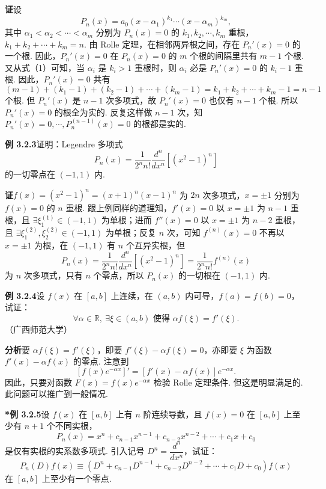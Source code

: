 \documentclass[UTF8,12pt,a4paper,fontset=fandol]{ctexart}
\begin{document}
\noindent\textbf{证}\quad 设
\begin{equation}
  P_n(x)=a_0(x-\alpha_1)^{k_1}\cdots(x-\alpha_m)^{k_m},
\tag{1}
\end{equation}
其中 $\alpha_1<\alpha_2<\cdots<\alpha_m$ 分别为 $P_n(x)=0$ 的 $k_1,k_2,\cdots,k_m$ 重根，$k_1+k_2+\cdots+k_m=n$. 由 Rolle 定理，在相邻两异根之间，存在 $P_n'(x)=0$ 的一个根. 因此，$P_n'(x)=0$ 在 $P_n(x)=0$ 的 $m$ 个根的间隔里共有 $m-1$ 个根. 又从式（1）可知，当 $\alpha_i$ 是 $k_i>1$ 重根时，则 $\alpha_i$ 必是 $P_n'(x)=0$ 的 $k_i-1$ 重根. 因此，$P_n'(x)=0$ 共有
\[
  (m-1)+(k_1-1)+(k_2-1)+\cdots+(k_m-1)
  =k_1+k_2+\cdots+k_m-1=n-1
\]
个根. 但 $P_n'(x)$ 是 $n-1$ 次多项式，故 $P_n'(x)=0$ 也仅有 $n-1$ 个根. 所以 $P_n'(x)=0$ 的根全为实的. 反复这样做 $n-1$ 次，知 $P_n'(x)=0,\cdots,P_n^{(n-1)}(x)=0$ 的根都是实的.

\noindent\textbf{例 3.2.3}\quad 证明：Legendre 多项式
\[
  P_n(x)=\frac{1}{2^nn!}\frac{d^n}{dx^n}\left[(x^2-1)^n\right]
\]
的一切零点在 $(-1,1)$ 内.

\noindent\textbf{证}\quad $f(x)=(x^2-1)^n=(x+1)^n(x-1)^n$ 为 $2n$ 次多项式，$x=\pm1$ 分别为 $f(x)=0$ 的 $n$ 重根. 跟上例同样的道理知，$f'(x)=0$ 以 $x=\pm1$ 为 $n-1$ 重根，且 $\exists\xi_1^{(1)}\in(-1,1)$ 为单根；进而 $f''(x)=0$ 以 $x=\pm1$ 为 $n-2$ 重根，且 $\exists\xi_1^{(2)},\xi_2^{(2)}\in(-1,1)$ 为单根；反复 $n$ 次，可知 $f^{(n)}(x)=0$ 不再以 $x=\pm1$ 为根，在 $(-1,1)$ 有 $n$ 个互异实根，但
\[
  P_n(x)=\frac{1}{2^nn!}\frac{d^n}{dx^n}\left[(x^2-1)^n\right]
  =\frac{1}{2^nn!}f^{(n)}(x)
\]
为 $n$ 次多项式，只有 $n$ 个零点，所以 $P_n(x)$ 的一切根在 $(-1,1)$ 内.

\noindent\textbf{例 3.2.4}\quad 设 $f(x)$ 在 $[a,b]$ 上连续，在 $(a,b)$ 内可导，$f(a)=f(b)=0$，试证：
\[
  \forall\alpha\in\mathbb{R},\ \exists\xi\in(a,b)\text{ 使得 }\alpha f(\xi)=f'(\xi).
\]
（广西师范大学）

\noindent\textbf{分析}\quad 要 $\alpha f(\xi)=f'(\xi)$，即要 $f'(\xi)-\alpha f(\xi)=0$，亦即要 $\xi$ 为函数 $f'(x)-\alpha f(x)$ 的零点. 注意到
\[
  [f(x)e^{-\alpha x}]'=[f'(x)-\alpha f(x)]e^{-\alpha x}.
\]
因此，只要对函数 $F(x)=f(x)e^{-\alpha x}$ 检验 Rolle 定理条件. 但这是明显满足的. 此问题可以推广到一般情况.

\noindent\textbf{*例 3.2.5}\quad 设 $f(x)$ 在 $[a,b]$ 上有 $n$ 阶连续导数，且 $f(x)=0$ 在 $[a,b]$ 上至少有 $n+1$ 个不同实根，
\[
  P_n(x)=x^n+c_{n-1}x^{n-1}+c_{n-2}x^{n-2}+\cdots+c_1x+c_0
\]
是仅有实根的实系数多项式. 引入记号 $D^n=\dfrac{d^n}{dx^n}$，试证：
\[
  P_n(D)f(x)\equiv(D^n+c_{n-1}D^{n-1}+c_{n-2}D^{n-2}+\cdots+c_1D+c_0)f(x)
\]
在 $[a,b]$ 上至少有一个零点.
\end{document}
